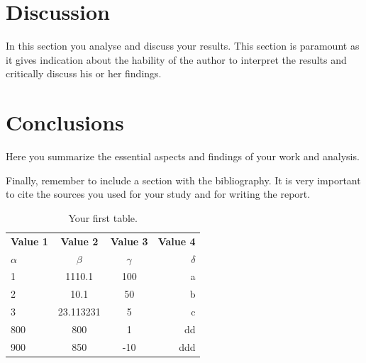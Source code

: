 \documentclass[a4paper,10pt]{article}
\begin{document}
\section{Discussion}
In this section you analyse and discuss your results.
This section is paramount as it gives indication about the 
hability of the author to interpret the results and 
critically discuss his or her findings.

\section{Conclusions}
Here you summarize the essential aspects and findings 
of your work and analysis.

Finally, remember to include a section with the bibliography.
It is very important to cite the sources you used for your study and
for writing the report.



\begin{table}[h!]

\begin{center}

\begin{tabular}{l|c|c|r} %

\hline
\hline

\textbf{Value 1} & \textbf{Value 2} & \textbf{Value 3}  & \textbf{Value 4}\\

$\alpha$ & $\beta$ & $\gamma$ & $\delta$\\

\hline
\hline

1 & 1110.1 & 100 & a \\

2 & 10.1 & 50 & b \\

3 & 23.113231 & 5 & c \\

800 & 800 & 1 & dd \\

900 & 850 & -10 & ddd \\

\end{tabular}

\caption{Your first table.}

\label{tab:table1}

\end{center}

\end{table}
\end{document}
